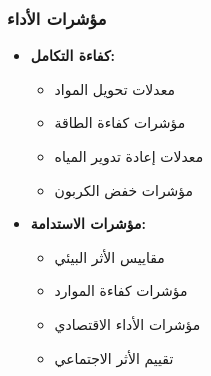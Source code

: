 \subsubsection{مؤشرات الأداء}
\begin{itemize}
    \item \textbf{كفاءة التكامل:}
    \begin{itemize}
        \item معدلات تحويل المواد
        \item مؤشرات كفاءة الطاقة
        \item معدلات إعادة تدوير المياه
        \item مؤشرات خفض الكربون
    \end{itemize}
    
    \item \textbf{مؤشرات الاستدامة:}
    \begin{itemize}
        \item مقاييس الأثر البيئي
        \item مؤشرات كفاءة الموارد
        \item مؤشرات الأداء الاقتصادي
        \item تقييم الأثر الاجتماعي
    \end{itemize}
\end{itemize}
